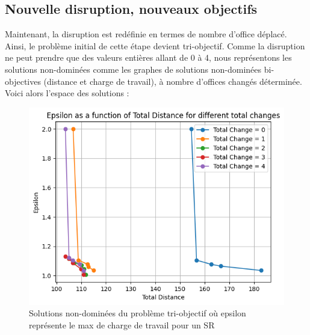 \subsection{Nouvelle disruption, nouveaux objectifs}

Maintenant, la disruption est redéfinie en termes de nombre d'office déplacé. Ainsi, le problème initial de cette étape devient tri-objectif. Comme la disruption ne peut prendre que des valeurs entières allant de 0 à 4, nous représentons les solutions non-dominées comme les graphes de solutions non-dominées bi-objectives (distance et charge de travail), à nombre d'offices changés déterminée. Voici alors l'espace des solutions :

\begin{figure}[H]
    \centering
    \includegraphics[width=\textwidth]{Images/step_3/tri-objectif.png}
    \caption{Solutions non-dominées du problème tri-objectif où epsilon représente le max de charge de travail pour un SR}
    \label{fig:nom_de_reference}
\end{figure}
